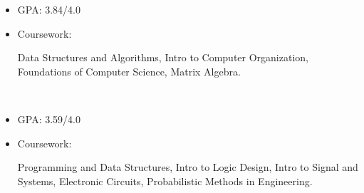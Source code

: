 \newcommand{\TUBentry}{
    \TUB
    \poswithprd{Introduction to 3D Scanning and Printing at TUB Winter University}{Jan 2018-Feb 2018}
    \begin{itemize}
        \item 
        Learned the basic of 3D scanning \& printing. Learned Blender for 3D modeling.
    \end{itemize}
}



\UM
{}
\begin{itemize}
    \item GPA: 3.84/4.0
    \item Coursework: 
    \begin{minipage}[t]{\courseworkwidth}
        Data Structures and Algorithms,
        Intro to Computer Organization,
        Foundations of Computer Science,
        Matrix Algebra.
    \end{minipage}\\
\end{itemize}

\JI
{}
\begin{itemize}
    \item GPA: 3.59/4.0
    \item Coursework:
    \begin{minipage}[t]{\courseworkwidth}
        Programming and Data Structures,
        Intro to Logic Design,
        Intro to Signal and Systems,
        Electronic Circuits,
        Probabilistic Methods in Engineering.
    \end{minipage}\\
\end{itemize}